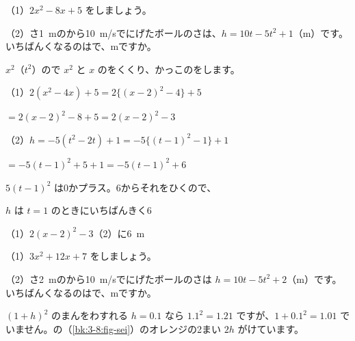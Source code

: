 \begin{reidai}
（1）$2x^2-8x+5$ をしましょう。\par
（2）さ\qty{1}{m}のから\qty{10}{m/s}でにげたボールのさは、$h=10t-5t^2+1$（m）です。いちばんくなるのはで、mですか。\par
\kangaekata $x^2$（$t^2$）ので $x^2$ と $x$ のをくくり、かっこのをします。\par
\shiki（1）\nobreak $2(x^2-4x)+5=2\{(x-2)^2-4\}+5$\par
\hspace*{2.6\zw}\phantom{（1）}$=2(x-2)^2-8+5=2(x-2)^2-3$\par
\hspace*{2.6\zw}（2）\nobreak $h=-5(t^2-2t)+1=-5\{(t-1)^2-1\}+1$\par
\hspace*{2.6\zw}\phantom{（2）}$=-5(t-1)^2+5+1=-5(t-1)^2+6$\par
\hspace*{2.6\zw}\phantom{（2）}$5(t-1)^2$ は0かプラス。6からそれをひくので、\par
\hspace*{2.6\zw}\phantom{（2）}$h$ は $t=1$ のときにいちばんきく6\par
\kotae（1）\nobreak $2(x-2)^2-3$\qquad（2）に\qty{6}{m}
\end{reidai}

\begin{jibun}
（1）$3x^2+12x+7$ をしましょう。\par
（2）さ\qty{2}{m}のから\qty{10}{m/s}でにげたボールのさは $h=10t-5t^2+2$（m）です。いちばんくなるのはで、mですか。
\end{jibun}



\label{bk:3-8:tsuma}

\begin{tsumazuki}{$(1+h)^2$ のまんをわすれる}
$h=0.1$ なら $1.1^2=1.21$ ですが、$1+0.1^2=1.01$ でいません。の（\ref{bk:3-8:fig-sei}）のオレンジの2まい $2h$ がけています。
\end{tsumazuki}

